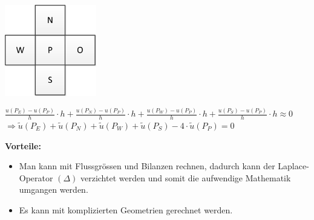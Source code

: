 \begin{minipage}{4cm}
	\includegraphics[width=4cm]{Content/Numerik/FVMPrinzip.png}
\end{minipage}
\hfill
\begin{minipage}{14cm}
	$\frac{u(P_E)-u(P_P)}{h}\cdot h+\frac{u(P_N)-u(P_P)}{h}\cdot h+\frac{u(P_W)-u(P_P)}{h}\cdot h+\frac{u(P_S)-u(P_P)}{h}\cdot h\approx 0$\\
	
	$\Rightarrow\tilde{u}(P_E)+\tilde{u}(P_N)+\tilde{u}(P_W)+\tilde{u}(P_S)-4\cdot\tilde{u}(P_P)=0$
\end{minipage}

\textbf{Vorteile:}\\
\begin{itemize}
\item Man kann mit Flussgrössen und Bilanzen rechnen, dadurch kann der
Laplace-Operator $(\Delta)$ verzichtet werden und somit die aufwendige Mathematik umgangen werden.
\item Es kann mit komplizierten Geometrien gerechnet werden.  
\end{itemize}

